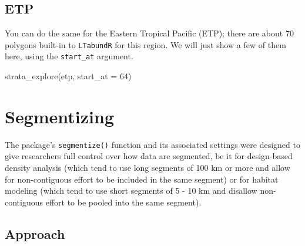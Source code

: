 \documentclass[
]{book}
\newenvironment{Shaded}{\begin{snugshade}}{\end{snugshade}}
\newcommand{\AttributeTok}[1]{\textcolor[rgb]{0.77,0.63,0.00}{#1}}
\newcommand{\DecValTok}[1]{\textcolor[rgb]{0.00,0.00,0.81}{#1}}
\newcommand{\FunctionTok}[1]{\textcolor[rgb]{0.00,0.00,0.00}{#1}}
\newcommand{\NormalTok}[1]{#1}
\newcommand{\StringTok}[1]{\textcolor[rgb]{0.31,0.60,0.02}{#1}}
\begin{document}
\hypertarget{etp}{%
\section*{ETP}\label{etp}}

You can do the same for the Eastern Tropical Pacific (ETP); there are about 70 polygons built-in to \texttt{LTabundR} for this region. We will just show a few of them here, using the \texttt{start\_at} argument.

\begin{Shaded}
\begin{Highlighting}[]
\FunctionTok{strata\_explore}\NormalTok{(}\StringTok{\textquotesingle{}etp\textquotesingle{}}\NormalTok{,}
               \AttributeTok{start\_at =} \DecValTok{64}\NormalTok{)}
\end{Highlighting}
\end{Shaded}

\hypertarget{segmentizing}{%
\chapter{Segmentizing}\label{segmentizing}}

The package's \texttt{segmentize()} function and its associated settings were designed to give researchers full control over how data are segmented, be it for design-based density analysis (which tend to use long segments of 100 km or more and allow for non-contiguous effort to be included in the same segment) or for habitat modeling (which tend to use short segments of 5 - 10 km and disallow non-contiguous effort to be pooled into the same segment).

\hypertarget{approach}{%
\section*{Approach}\label{approach}}
\end{document}
